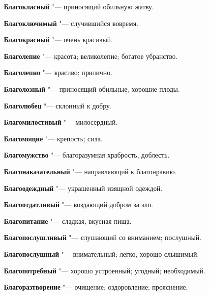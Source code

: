 \begin{mymulticols}{2}
\noindent\textbf{Благокласный} "--- приносящий обильную жатву. 




\noindent\textbf{Благоключимый} "--- случившийся вовремя. 




\noindent\textbf{Благокрасный} "--- очень красивый. 




\noindent\textbf{Благолепие} "--- красота; великолепие; богатое убранство. 




\noindent\textbf{Благолепно} "--- красиво; прилично. 




\noindent\textbf{Благолозный} "--- приносящий обильные, хорошие плоды. 




\noindent\textbf{Благолюбец} "--- склонный к добру. 




\noindent\textbf{Благомилостивый} "--- милосердный. 




\noindent\textbf{Благомощие} "--- крепость; сила. 




\noindent\textbf{Благомужство} "--- благоразумная храбрость, доблесть. 




\noindent\textbf{Благонаказательный} "--- направляющий к благонравию. 




\noindent\textbf{Благоодеждный} "--- украшенный изящной одеждой. 




\noindent\textbf{Благоотдатливый} "--- воздающий добром за зло. 




\noindent\textbf{Благопитание} "--- сладкая, вкусная пища. 




\noindent\textbf{Благопослушливый} "--- слушающий со вниманием; послушный. 




\noindent\textbf{Благопослушный} "--- внимательный; легко, хорошо слышимый. 




\noindent\textbf{Благопотребный} "--- хорошо устроенный; угодный; необходимый. 




\noindent\textbf{Благоразтворение} "--- очищение; оздоровление; прояснение. 





\end{mymulticols}
